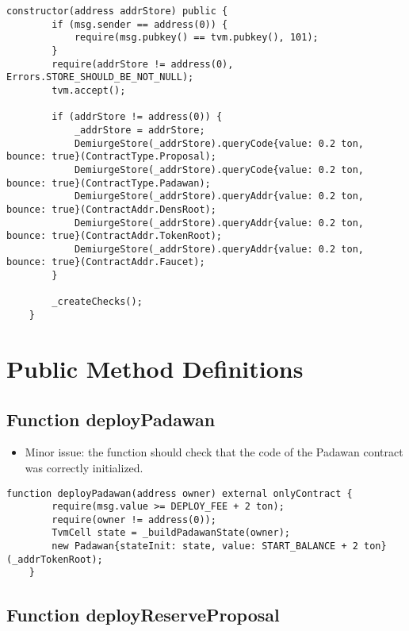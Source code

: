 \begin{lstlisting}[firstnumber=82]
    constructor(address addrStore) public {
        if (msg.sender == address(0)) {
            require(msg.pubkey() == tvm.pubkey(), 101);
        }
        require(addrStore != address(0), Errors.STORE_SHOULD_BE_NOT_NULL);
        tvm.accept();
        
        if (addrStore != address(0)) {
            _addrStore = addrStore;
            DemiurgeStore(_addrStore).queryCode{value: 0.2 ton, bounce: true}(ContractType.Proposal);
            DemiurgeStore(_addrStore).queryCode{value: 0.2 ton, bounce: true}(ContractType.Padawan);
            DemiurgeStore(_addrStore).queryAddr{value: 0.2 ton, bounce: true}(ContractAddr.DensRoot);
            DemiurgeStore(_addrStore).queryAddr{value: 0.2 ton, bounce: true}(ContractAddr.TokenRoot);
            DemiurgeStore(_addrStore).queryAddr{value: 0.2 ton, bounce: true}(ContractAddr.Faucet);
        }

        _createChecks();
    }
\end{lstlisting}

\section{Public Method Definitions}


\subsection{Function deployPadawan}

\begin{itemize}
\item Minor issue: the function should check that the code of the
  Padawan contract was correctly initialized.
\end{itemize}

\begin{lstlisting}[firstnumber=103]
    function deployPadawan(address owner) external onlyContract {
        require(msg.value >= DEPLOY_FEE + 2 ton);
        require(owner != address(0));
        TvmCell state = _buildPadawanState(owner);
        new Padawan{stateInit: state, value: START_BALANCE + 2 ton}(_addrTokenRoot);
    }
\end{lstlisting}

\subsection{Function deployReserveProposal}

